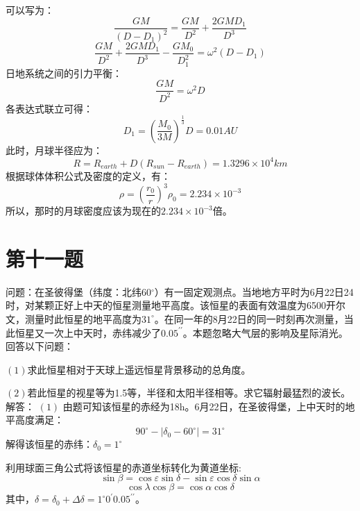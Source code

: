 \documentclass[a4paper,12pt]{report}
\begin{document}
可以写为：
\begin{equation}
	\frac{GM}{(D-D_{1})^2}=\frac{GM}{D^2}+\frac{2GMD_{1}}{D^3}
\end{equation}
\begin{equation}
	\frac{GM}{D^2}+\frac{2GMD_{1}}{D^3}-\frac{GM_{0}}{D_1^{2}}=\omega ^2(D-D_{1})
\end{equation}
日地系统之间的引力平衡：
\begin{equation}
	\frac{GM}{D^2}=\omega^2 D
\end{equation}
各表达式联立可得：
\begin{equation}
	D_{1}=(\frac{M_{0}}{3M})^{\frac{1}{3}}D=0.01AU
\end{equation}
此时，月球半径应为：
\begin{equation}
	R=R_{earth}+D(R_{sun}-R_{earth})=1.3296\times 10^{4}km
\end{equation}
根据球体体积公式及密度的定义，有：
\begin{equation}
	\rho =(\frac{r_{0}}{r})^3\rho_{0}=2.234\times 10^{-3}
\end{equation}
所以，那时的月球密度应该为现在的$2.234\times 10^{-3}$倍。
\section{第十一题}
\noindent 问题：在圣彼得堡（纬度：北纬60$^\circ$）有一固定观测点。当地地方平时为6月22日24时，对某颗正好上中天的恒星测量地平高度。该恒星的表面有效温度为6500开尔文，测量时此恒星的地平高度为$31^\circ$。在同一年的8月22日的同一时刻再次测量，当此恒星又一次上中天时，赤纬减少了$0.05^{\prime\prime}$。本题忽略大气层的影响及星际消光。回答以下问题：

$\left(1\right)$求此恒星相对于天球上遥远恒星背景移动的总角度。

$\left(2\right)$若此恒星的视星等为1.5等，半径和太阳半径相等。求它辐射最猛烈的波长。
\noindent 解答：
$\left(1\right)$
由题可知该恒星的赤经为18h。6月22日，在圣彼得堡，上中天时的地平高度满足：
\begin{equation}
	90^\circ-\lvert \delta_{0} -60^\circ \rvert=31^\circ 
\end{equation}
解得该恒星的赤纬：$\delta_{0} =1^\circ$

\noindent 利用球面三角公式将该恒星的赤道坐标转化为黄道坐标:
\begin{equation}
	\sin \beta =\cos \varepsilon \sin \delta -\sin \varepsilon \cos \delta \sin \alpha
\end{equation}
\begin{equation}
	\cos \lambda \cos \beta=\cos \alpha \cos \delta
\end{equation}
其中，$\delta =\delta_{0}+\Delta \delta=1^\circ 0^{\prime} 0.05^{\prime\prime}$。
\end{document}
